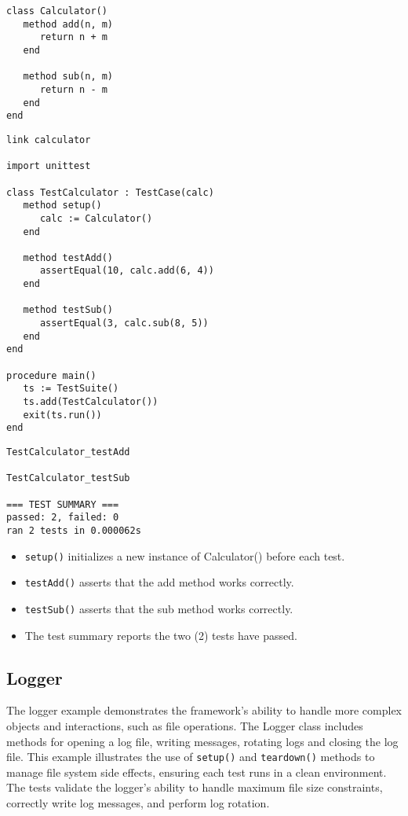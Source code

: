 \documentclass[letterpaper,12pt]{article}
\begin{document}
\bigskip{}
\begin{verbatim}
class Calculator()
   method add(n, m)
      return n + m
   end

   method sub(n, m)
      return n - m
   end
end
\end{verbatim}

\bigskip {}
\begin{verbatim}
link calculator

import unittest

class TestCalculator : TestCase(calc)
   method setup()
      calc := Calculator()
   end

   method testAdd()
      assertEqual(10, calc.add(6, 4))
   end

   method testSub()
      assertEqual(3, calc.sub(8, 5))
   end
end

procedure main()
   ts := TestSuite()
   ts.add(TestCalculator())
   exit(ts.run())
end
\end{verbatim}

\bigskip{}
\begin{verbatim}
TestCalculator_testAdd

TestCalculator_testSub

=== TEST SUMMARY ===
passed: 2, failed: 0
ran 2 tests in 0.000062s
\end{verbatim}

\begin{itemize}
   \item \texttt{setup()} initializes a new instance of Calculator() before each test.
   \item \texttt{testAdd()} asserts that the add method works correctly.
   \item \texttt{testSub()} asserts that the sub method works correctly.
   \item The test summary reports the two (2) tests have passed.
\end{itemize}

\newpage\subsection{Logger}

The logger example demonstrates the framework's ability to handle more complex objects and interactions, such as file operations. The Logger class includes methods for opening a log file, writing messages, rotating logs and closing the log file. This example illustrates the use of \texttt{setup()} and \texttt{teardown()} methods to manage file system side effects, ensuring each test runs in a clean environment. The tests validate the logger's ability to handle maximum file size constraints, correctly write log messages, and perform log rotation.
\end{document}
